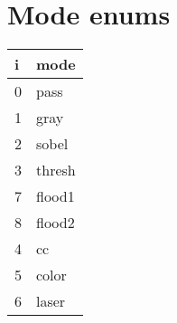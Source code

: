 \documentclass[]{article}
\begin{document}
\section{Mode enums}\label{mode-enums}

\begin{longtable}[c]{@{}ll@{}}
\toprule
i & mode\tabularnewline
\midrule
\endhead
0 & pass\tabularnewline
1 & gray\tabularnewline
2 & sobel\tabularnewline
3 & thresh\tabularnewline
7 & flood1\tabularnewline
8 & flood2\tabularnewline
4 & cc\tabularnewline
5 & color\tabularnewline
6 & laser\tabularnewline
\bottomrule
\end{longtable}
\end{document}
